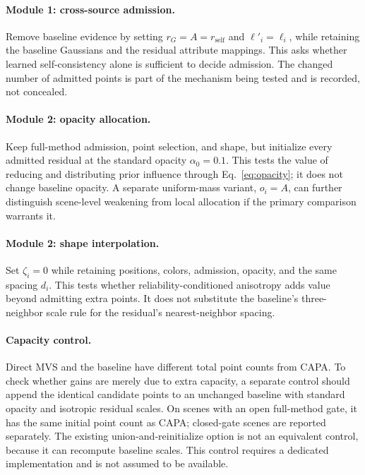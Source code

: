 \documentclass{article}
\newcommand{\ours}{CAPA}
\newcommand{\rself}{r_{\mathrm{self}}}
\begin{document}
\paragraph{Module 1: cross-source admission.}
Remove baseline evidence by setting $r_G=A=\rself$ and $\ell'_i=\ell_i$, while retaining the baseline Gaussians and the residual attribute mappings. This asks whether learned self-consistency alone is sufficient to decide admission. The changed number of admitted points is part of the mechanism being tested and is recorded, not concealed.

\paragraph{Module 2: opacity allocation.}
Keep full-method admission, point selection, and shape, but initialize every admitted residual at the standard opacity $\alpha_0=0.1$. This tests the value of reducing and distributing prior influence through Eq.~\eqref{eq:opacity}; it does not change baseline opacity. A separate uniform-mass variant, $o_i=A$, can further distinguish scene-level weakening from local allocation if the primary comparison warrants it.

\paragraph{Module 2: shape interpolation.}
Set $\zeta_i=0$ while retaining positions, colors, admission, opacity, and the same spacing $d_i$. This tests whether reliability-conditioned anisotropy adds value beyond admitting extra points. It does not substitute the baseline's three-neighbor scale rule for the residual's nearest-neighbor spacing.

\paragraph{Capacity control.}
Direct MVS and the baseline have different total point counts from \ours{}. To check whether gains are merely due to extra capacity, a separate control should append the identical candidate points to an unchanged baseline with standard opacity and isotropic residual scales. On scenes with an open full-method gate, it has the same initial point count as \ours{}; closed-gate scenes are reported separately. The existing union-and-reinitialize option is not an equivalent control, because it can recompute baseline scales. This control requires a dedicated implementation and is not assumed to be available.
\end{document}
